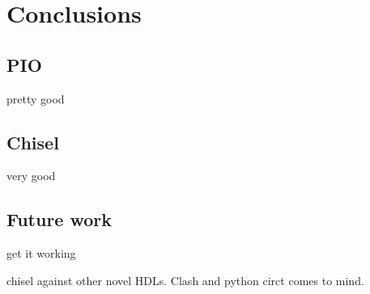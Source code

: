\chapter{Conclusions}
\label{ch:conclusions}

\section{PIO}
pretty good

\section{Chisel}
very good
\section{Future work}
get it working

chisel against other novel HDLs. Clash and python circt comes to mind.